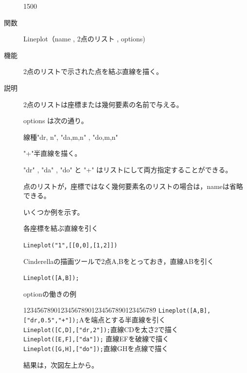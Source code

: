 \documentclass[papersize,a4paper,12pt,uplatex]{jsarticle}
\begin{document}
\begin{description}
\vspace{75mm}
\begin{layer}{150}{0}
\end{layer}

\vspace{70mm}

\vspace{\baselineskip}
\hypertarget{lineplot}{}
\item[関数]Lineplot（name , 2点のリスト , options)
\item[機能]2点のリストで示された点を結ぶ直線を描く。
\item[説明]2点のリストは座標または幾何要素の名前で与える。

options は次の通り。

線種"dr, n", "da,m,n" , "do,m,n"

 "+"半直線を描く。

"dr" , "da" , "do" と "+" はリストにして両方指定することができる。

点のリストが，座標ではなく幾何要素名のリストの場合は，nameは省略できる。

いくつか例を示す。

\vspace{\baselineskip}
各座標を結ぶ直線を引く

\hspace{5mm} \verb|Lineplot("1",[[0,0],[1,2]])|

Cinderellaの描画ツールで2点A,Bをとっておき，直線ABを引く

\hspace{5mm} \verb|Lineplot([A,B]);| 

optionの働きの例
\begin{tabbing}
1234\=56789012345678901234567890123456789\=\kill
 \> \verb|Lineplot([A,B],["dr,0.5","+"]);|\>Aを端点とする半直線を引く\\
 \> \verb|Lineplot([C,D],["dr,2"]);|\>直線CDを太さ2で描く\\
 \> \verb|Lineplot([E,F],["da"]);| \>直線EFを破線で描く\\
 \> \verb|Lineplot([G,H],["do"]);|\>直線GHを点線で描く
\end{tabbing}
結果は，次図左上から。


\end{description}
\end{document}
